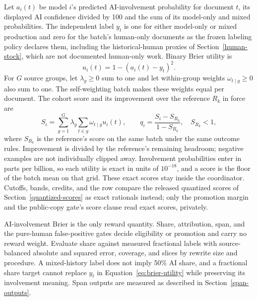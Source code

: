 Let \(a_i(t)\) be model \(i\)'s predicted AI-involvement probability for document
\(t\), its displayed AI confidence divided by 100 and the sum of its model-only
and mixed probabilities. The independent label \(y_t\) is one for either
model-only or mixed production and zero for the batch's human-only documents
as the frozen labeling policy declares them, including the historical-human
proxies of Section~\ref{human-stock}, which are not documented human-only
work. Binary Brier utility is
\begin{equation}\label{eq:brier-utility}
 u_i(t)=1-(a_i(t)-y_t)^2.
\end{equation}
For \(G\) source groups, let \(\lambda_g\geq0\) sum to one and let within-group
weights \(\omega_{t\mid g}\geq0\) also sum to one. The self-weighting batch makes
these weights equal per document. The cohort score and its improvement over the
reference \(R_k\) in force are
\begin{equation}\label{eq:a-quality}
 S_i=\sum_{g=1}^{G}\lambda_g\sum_{t\in g}\omega_{t\mid g}u_i(t),
 \qquad
 q_i=\frac{S_i-S_{R_k}}{1-S_{R_k}},\quad S_{R_k}<1,
\end{equation}
where \(S_{R_k}\) is the reference's score on the same batch under the same
outcome rules. Improvement is divided by the reference's remaining headroom;
negative examples are not individually clipped away. Involvement probabilities
enter in parts per billion, so each utility is exact in units of \(10^{-18}\),
and a score is the floor of the batch mean on that grid. These exact scores
stay inside the coordinator. Cutoffs, bands, credits, and the row compare the
released quantized scores of Section~\ref{quantized-scores} as exact
rationals instead; only the promotion margin and the public-copy gate's score
clause read exact scores, privately.

AI-involvement Brier is the only reward quantity. Share, attribution, span, and
the pure-human false-positive gates decide eligibility or promotion and carry
no reward weight. Evaluate share against measured fractional labels with source-balanced
absolute and squared error, coverage, and slices by rewrite size and procedure.
A mixed-history label does not imply 50\% AI share, and a fractional share target
cannot replace \(y_t\) in Equation~\ref{eq:brier-utility} while preserving its
involvement meaning. Span outputs are measured as described in
Section~\ref{span-outputs}.

